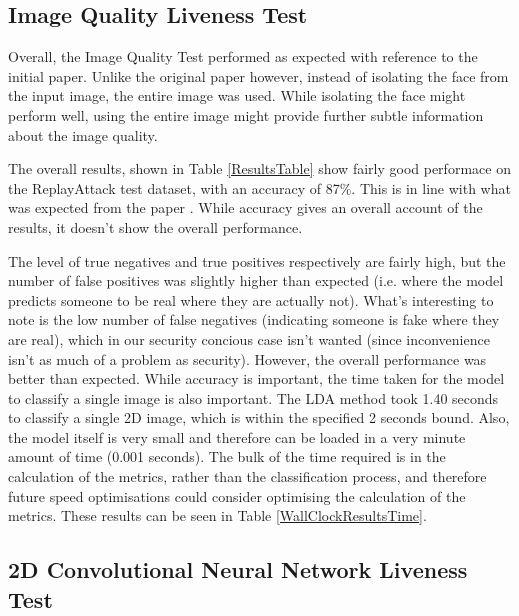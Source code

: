 \documentclass[11pt,a4paper]{article}
\begin{document}
    \subsection{Image Quality Liveness Test}
        Overall, the Image Quality Test performed as expected with reference to the initial paper. Unlike the original paper however, instead of isolating the face
        from the input image, the entire image was used. While isolating the face might perform well, using the entire image might provide further subtle information
        about the image quality.

        The overall results, shown in Table \ref{ResultsTable} show fairly good performace on the ReplayAttack test dataset, with an accuracy of 87\%. This is in line with
        what was expected from the paper \cite{ImageQualityAssessmentTest}. While accuracy gives an overall account of the results, it doesn't show the overall performance.
        
        The level of true negatives and true positives respectively are fairly high, but the number of false positives was slightly higher than expected (i.e. where the model predicts someone to be real where they are actually not).
        What's interesting to note is the low number of false negatives (indicating someone is fake where they are real), which in our security concious case isn't wanted (since inconvenience isn't as much of a problem as security).
        However, the overall performance was better than expected.
        While accuracy is important, the time taken for the model to classify a single image is also important. The LDA method took 1.40 seconds to classify a single 2D image, which is within the specified 2 seconds bound.
        Also, the model itself is very small and therefore can be loaded in a very minute amount of time (0.001 seconds). The bulk of the time required is in the calculation of the metrics, rather than the classification process,
        and therefore future speed optimisations could consider optimising the calculation of the metrics. These results can be seen in Table \ref{WallClockResultsTime}.

    \subsection{2D Convolutional Neural Network Liveness Test}
\end{document}
